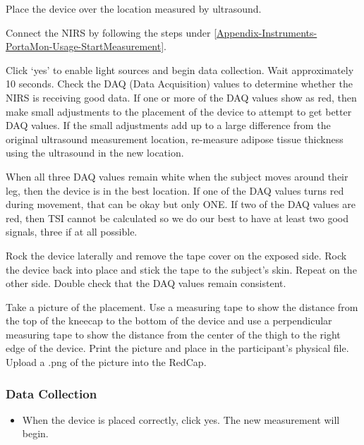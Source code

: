 \documentclass[
]{book}
\providecommand{\tightlist}{%
  \setlength{\itemsep}{0pt}\setlength{\parskip}{0pt}}
\begin{document}
Place the device over the location measured by ultrasound.

Connect the NIRS by following the steps under \ref{Appendix-Instruments-PortaMon-Usage-StartMeasurement}.

Click `yes' to enable light sources and begin data collection. Wait approximately 10 seconds. Check the DAQ (Data Acquisition) values to determine whether the NIRS is receiving good data. If one or more of the DAQ values show as red, then make small adjustments to the placement of the device to attempt to get better DAQ values. If the small adjustments add up to a large difference from the original ultrasound measurement location, re-measure adipose tissue thickness using the ultrasound in the new location.

When all three DAQ values remain white when the subject moves around their leg, then the device is in the best location. If one of the DAQ values turns red during movement, that can be okay but only ONE. If two of the DAQ values are red, then TSI cannot be calculated so we do our best to have at least two good signals, three if at all possible.

Rock the device laterally and remove the tape cover on the exposed side. Rock the device back into place and stick the tape to the subject's skin. Repeat on the other side. Double check that the DAQ values remain consistent.

Take a picture of the placement. Use a measuring tape to show the distance from the top of the kneecap to the bottom of the device and use a perpendicular measuring tape to show the distance from the center of the thigh to the right edge of the device. Print the picture and place in the participant's physical file. Upload a .png of the picture into the RedCap.

\hypertarget{Appendix-Instruments-PortaMon-Usage-DataCollection}{%
\subsubsection{Data Collection}\label{Appendix-Instruments-PortaMon-Usage-DataCollection}}

\begin{itemize}
\tightlist
\item
  When the device is placed correctly, click yes. The new measurement will begin.
\end{itemize}
\end{document}
